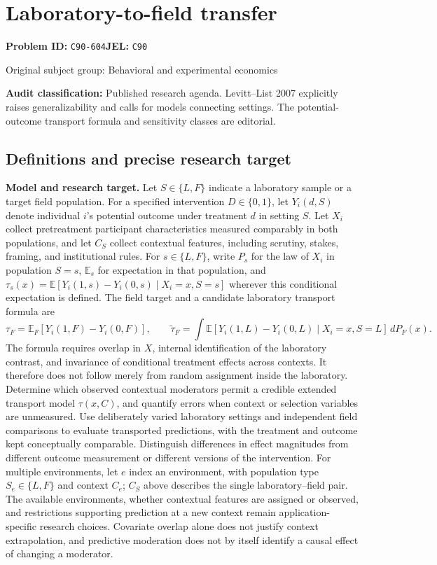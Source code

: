 \documentclass[11pt,a4paper]{article}
\begin{document}
\section*{Laboratory-to-field transfer}
\textbf{Problem ID:} \texttt{C90-604}\quad \textbf{JEL:} \texttt{C90}\par
\label{problem:OP-0306}
{\sffamily\small\color{muted}Original subject group: Behavioral and experimental economics\par}
\label{definitions:problem:30007588}
\textbf{Audit classification:} Published research agenda. Levitt–List 2007 explicitly raises generalizability and calls for models connecting settings. The potential-outcome transport formula and sensitivity classes are editorial.
\subsection*{Definitions and precise research target}
\textbf{Model and research target.} Let \(S\in\{L,F\}\) indicate a laboratory sample or a target field population. For a specified intervention \(D\in\{0,1\}\), let \(Y_i(d,S)\) denote individual \(i\)'s potential outcome under treatment \(d\) in setting \(S\). Let \(X_i\) collect pretreatment participant characteristics measured comparably in both populations, and let \(C_S\) collect contextual features, including scrutiny, stakes, framing, and institutional rules. For \(s\in\{L,F\}\), write \(P_s\) for the law of \(X_i\) in population \(S=s\), \(\mathbb E_s\) for expectation in that population, and \(\tau_s(x)=\mathbb E[Y_i(1,s)-Y_i(0,s)\mid X_i=x,S=s]\) wherever this conditional expectation is defined. The field target and a candidate laboratory transport formula are
\[\tau_F=\mathbb E_F[Y_i(1,F)-Y_i(0,F)],\qquad \widetilde\tau_F=\int\mathbb E[Y_i(1,L)-Y_i(0,L)\mid X_i=x,S=L]\,dP_F(x).\]
The formula requires overlap in \(X\), internal identification of the laboratory contrast, and invariance of conditional treatment effects across contexts. It therefore does not follow merely from random assignment inside the laboratory. Determine which observed contextual moderators permit a credible extended transport model \(\tau(x,C)\), and quantify errors when context or selection variables are unmeasured. Use deliberately varied laboratory settings and independent field comparisons to evaluate transported predictions, with the treatment and outcome kept conceptually comparable. Distinguish differences in effect magnitudes from different outcome measurement or different versions of the intervention. For multiple environments, let \(e\) index an environment, with population type \(S_e\in\{L,F\}\) and context \(C_e\); \(C_S\) above describes the single laboratory--field pair. The available environments, whether contextual features are assigned or observed, and restrictions supporting prediction at a new context remain application-specific research choices. Covariate overlap alone does not justify context extrapolation, and predictive moderation does not by itself identify a causal effect of changing a moderator.
\end{document}
